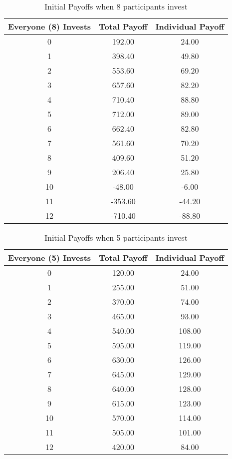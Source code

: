 \begin{table}[H]
\centering
\setlength{\tabcolsep}{15pt}
\begin{tabular}{ccc}


{\bf Everyone (8) Invests} & {\bf Total Payoff} & {\bf Individual Payoff} \\
 \toprule
 0 & 192.00 & 24.00 \\[0.5ex]
 1 & 398.40 & 49.80 \\[0.5ex]
 2 & 553.60 & 69.20 \\[0.5ex]
 3 & 657.60 & 82.20 \\[0.5ex]
 4 & 710.40 & 88.80 \\[0.5ex]
 5 & 712.00 & 89.00 \\[0.5ex]
 6 & 662.40 & 82.80 \\[0.5ex]
 7 & 561.60 & 70.20 \\[0.5ex]
 8 & 409.60 & 51.20 \\[0.5ex]
 9 & 206.40 & 25.80 \\[0.5ex]
 10 & -48.00 & -6.00 \\[0.5ex]
 11 & -353.60 & -44.20 \\[0.5ex]
 12 & -710.40 & -88.80 \\
 \bottomrule

\end{tabular}
\caption{Initial Payoffs when 8 participants invest}
\end{table}

\begin{table}[H]
\centering
\setlength{\tabcolsep}{15pt}
\begin{tabular}{ccc}

{\bf Everyone (5) Invests} & {\bf Total Payoff} & {\bf Individual Payoff} \\
 \toprule
 0 & 120.00 & 24.00 \\[0.5ex]
 1 & 255.00 & 51.00 \\[0.5ex]
 2 & 370.00 & 74.00 \\[0.5ex]
 3 & 465.00 & 93.00 \\[0.5ex]
 4 & 540.00 & 108.00 \\[0.5ex]
 5 & 595.00 & 119.00 \\[0.5ex]
 6 & 630.00 & 126.00 \\[0.5ex]
 7 & 645.00 & 129.00 \\[0.5ex]
 8 & 640.00 & 128.00 \\[0.5ex]
 9 & 615.00 & 123.00 \\[0.5ex]
 10 & 570.00 & 114.00 \\[0.5ex]
 11 & 505.00 & 101.00 \\[0.5ex]
 12 & 420.00 & 84.00 \\
\bottomrule

\end{tabular}
\caption{Initial Payoffs when 5 participants invest}
\end{table}



